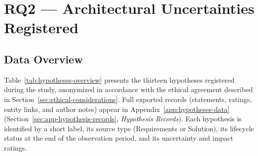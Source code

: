 \section{RQ2 — Architectural Uncertainties Registered}
\label{sec:rq2-results}
\label{sec:results-rq2}

\subsection{Data Overview}
\label{subsec:data-overview}

Table~\ref{tab:hypotheses-overview} presents the thirteen hypotheses registered
during the study, anonymized in accordance with the ethical agreement described
in Section~\ref{sec:ethical-considerations}. Full exported records (statements,
ratings, entity links, and author notes) appear in Appendix~\ref{app:hypotheses-data}
(Section~\ref{sec:app-hypothesis-records}, \textit{Hypothesis Records}). Each hypothesis is identified by a
short label, its source type (Requirements or Solution), its lifecycle status
at the end of the observation period, and its uncertainty and impact ratings.

